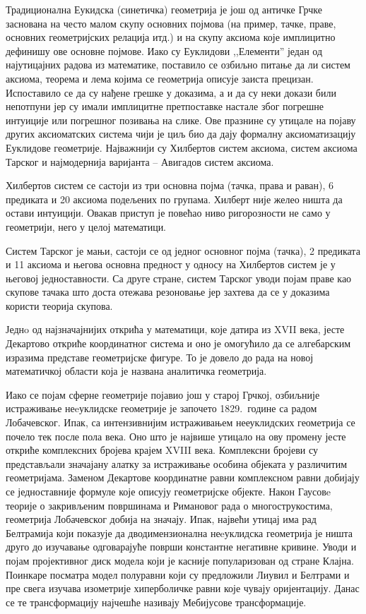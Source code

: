 \documentclass[11pt]{article}
\newcommand{\lat}{}
\begin{document}
Традиционална Еукидска (синетичка) геометрија је још од античке Грчке
заснована на често малом скупу основних појмова (на пример, тачке,
праве, основних геометријских релација итд.) и на скупу аксиома које
имплицитно дефинишу ове основне појмове. Иако су Еуклидови
,,Елементи'' један од најутицајних радова из математике, поставило се
озбиљно питање да ли систем аксиома, теорема и лема којима се
геометрија описује заиста прецизан. Испоставило се да су нађене грешке
у доказима, а и да су неки докази били непотпуни јер су имали
имплицитне претпоставке настале због погрешне интуиције или погрешног позивања на
слике. Ове празнине су утицале на појаву других аксиоматских система
чији је циљ био да дају формалну аксиоматизацију Еуклидове
геометрије. Најважнији су Хилбертов систем аксиома, систем аксиома
Тарског и најмодернија варијанта -- Авигадов систем аксиома.

Хилбертов систем се састоји из три основна појма (тачка, права и
раван), 6 предиката и 20 аксиома подељених по групама. Хилберт није
желео ништа да остави интуицији. Овакав приступ је повећао ниво
ригорозности не само у геометрији, него у целој математици.

Систем Тарског је мањи, састоји се од једног основног појма (тачка), 2
предиката и 11 аксиома и његова основна предност у односу на Хилбертов
систем је у његовој једноставности. Са друге стране, систем Тарског
уводи појам праве као скупове тачака што доста отежава резоновање јер
захтева да се у доказима користи теорија скупова.

Једнo од најзначајнијих открића у математици, које датира из {\lat
  XVII} века, јесте Декартово откриће координатног система и оно је
омогућило да се алгебарским изразима представе геометријске фигуре. То
је довело до рада на новој математичкој области која је названа
аналитичка геометрија. 

Иако се појам сферне геометрије појавио још у старој Грчкој, озбиљније
истраживање неeуклидске геометрије је започето 1829.~године са радом
Лобачевског. Ипак, са интензивнијим истраживањем нееуклидских
геометрија се почело тек после пола века. Оно што је највише утицало на
ову промену јесте откриће комплексних бројева крајем XVIII
века. Комплексни бројеви су представљали значајану алатку за
истраживање особина објеката у различитим геометријама. Заменом
Декартове координатне равни комплексном равни добијају се
је\-дно\-став\-ни\-је формуле које описују геометријске објекте. Након
Гаусовe теорије о закривљеним површинама и Римановог рада о
многострукостима, геометрија Лобачевског добија на значају. Ипак,
највећи утицај има рад Белтрамија који показује да дводимензионална
неeуклидска геометрија је ништа друго до изучавање одговарајуће површи
константне негативне кривине. Уводи и појам пројективног диск модела
који је касније популаризован од стране Клајна. Поинкаре посматра
модел полуравни који су предложили Лиувил и Белтрами и пре свега
изучава изометрије хиперболичке равни које чувају оријентацију. Данас
се те трансформацију најчешће називају Мебијусове трансформације.
\end{document}
